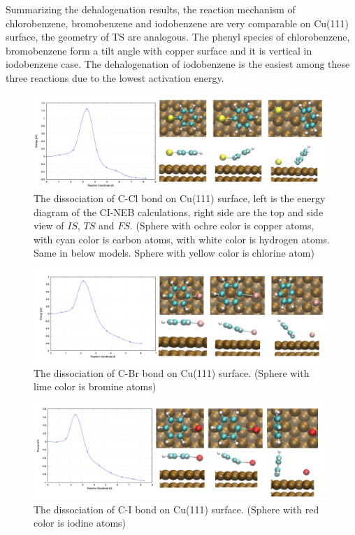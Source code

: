 \documentclass[aps,reprint,amsmath,amssymb]{revtex4-2}
\begin{document}
Summarizing the dehalogenation results, the reaction mechanism of chlorobenzene, bromobenzene and iodobenzene are very comparable on Cu(111) surface, the geometry of TS are analogous. The phenyl species of chlorobenzene, bromobenzene form a tilt angle with copper surface and it is vertical in iodobenzene case. The dehalogenation of iodobenzene is the easiest among these three reactions due to the lowest activation energy.


\begin{figure}[ht]
\centering
\includegraphics[width=0.98\textwidth]{Fig/dissociation_Cl.png}
\caption{The dissociation of C-Cl bond on Cu(111) surface, left is the energy diagram of the CI-NEB calculations, right side are the top and side view of $IS$, $TS$ and $FS$. (Sphere with ochre color is copper atoms, with cyan color is carbon atoms, with white color is hydrogen atoms. Same in below models. Sphere with yellow color is chlorine atom)}
\label{fig:dissociation_Cl}
\end{figure}

\begin{figure}[ht]
\centering
\includegraphics[width=0.98\textwidth]{Fig/dissociation_Br.png}
\caption{The dissociation of C-Br bond on Cu(111) surface. (Sphere with lime color is bromine atoms)}
\label{fig:dissociation_Br}
\end{figure}

\begin{figure}[ht]
\centering
\includegraphics[width=0.98\textwidth]{Fig/dissociation_I.png}
\caption{The dissociation of C-I bond on Cu(111) surface. (Sphere with red color is iodine atoms)}
\label{fig:dissociation_I}
\end{figure}
\end{document}

